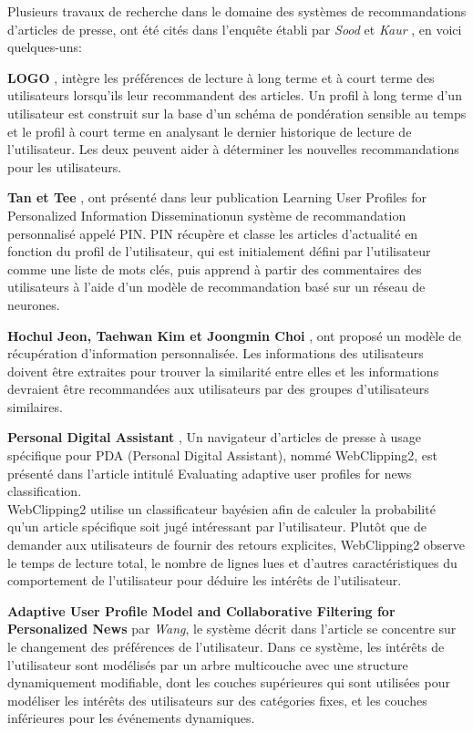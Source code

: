 Plusieurs travaux de recherche dans le domaine des systèmes de recommandations d'articles de presse, ont été cités dans l'enquête établi par \emph{Sood} et \emph{Kaur} \cite{surveyrecommender1}, en voici quelques-uns:

\textbf{LOGO} \cite{27}, intègre les préférences de lecture à long terme et à court terme des utilisateurs lorsqu'ils leur recommandent des articles. Un profil à long terme d'un utilisateur est construit sur la base d'un schéma de pondération sensible au temps \cite{28} et le profil à court terme en analysant le dernier historique de lecture de l'utilisateur. Les deux peuvent aider à déterminer les nouvelles recommandations pour les utilisateurs.

\textbf{Tan et Tee} \cite{29}, ont présenté dans leur publication \textquotedbl Learning User Profiles for Personalized Information Dissemination\textquotedbl un système de recommandation personnalisé appelé PIN. PIN récupère et classe les articles d'actualité en fonction du profil de l'utilisateur, qui est initialement défini par l'utilisateur comme une liste de mots clés, puis apprend à partir des commentaires des utilisateurs à l'aide d'un modèle de recommandation basé sur un réseau de neurones.

\textbf{Hochul Jeon, Taehwan Kim et Joongmin Choi} \cite{30}, ont proposé un modèle de récupération d'information personnalisée. Les informations des utilisateurs doivent être extraites pour trouver la similarité entre elles et les informations devraient être recommandées aux utilisateurs par des groupes d'utilisateurs similaires.

\textbf{Personal Digital Assistant} \cite{31}, Un navigateur d'articles de presse à usage spécifique pour PDA (Personal Digital Assistant), nommé WebClipping2, est présenté dans l'article intitulé \textquotedbl Evaluating adaptive user profiles for news classification\textquotedbl.\\ WebClipping2 utilise un classificateur bayésien afin de calculer la probabilité qu'un article spécifique soit jugé intéressant par l'utilisateur. Plutôt que de demander aux utilisateurs de fournir des retours explicites, WebClipping2 observe le temps de lecture total, le nombre de lignes lues et d'autres caractéristiques du comportement de l'utilisateur pour déduire les intérêts de l'utilisateur.

\textbf{Adaptive User Profile Model and Collaborative Filtering for Personalized News} \cite{32} par \emph{Wang}, le système décrit dans l'article se concentre sur le changement des préférences de l'utilisateur. Dans ce système, les intérêts de l'utilisateur sont modélisés par un arbre multicouche avec une structure dynamiquement modifiable, dont les couches supérieures qui sont utilisées pour modéliser les intérêts des utilisateurs sur des catégories fixes, et les couches inférieures pour les événements dynamiques. 

